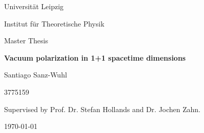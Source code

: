 \begin{titlepage}

\centering
\Large{Universität Leipzig}

\large{Institut für Theoretische Physik}

\large{Master Thesis}


\LARGE{\textbf{Vacuum polarization in 1+1 spacetime dimensions}}

\Large{Santiago Sanz-Wuhl}
\vspace{1cm}

\large{3775159}

Supervised by Prof. Dr. Stefan Hollands and Dr. Jochen Zahn.

\today

\end{titlepage}